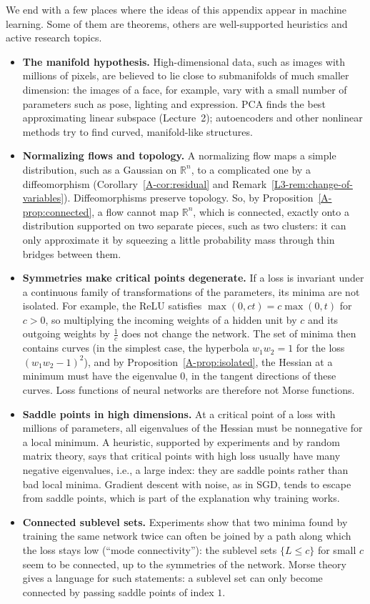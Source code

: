 We end with a few places where the ideas of this appendix appear in machine learning. Some of them are theorems, others are well-supported heuristics and active research topics.
\begin{itemize}
    \item \textbf{The manifold hypothesis.} High-dimensional data, such as images with millions of pixels, are believed to lie close to submanifolds of much smaller dimension: the images of a face, for example, vary with a small number of parameters such as pose, lighting and expression. PCA finds the best approximating linear subspace (Lecture~2); autoencoders and other nonlinear methods try to find curved, manifold-like structures.
    \item \textbf{Normalizing flows and topology.} A normalizing flow maps a simple distribution, such as a Gaussian on $\mathbb{R}^n$, to a complicated one by a diffeomorphism (Corollary~\ref{A-cor:residual} and Remark~\ref{L3-rem:change-of-variables}). Diffeomorphisms preserve topology. So, by Proposition~\ref{A-prop:connected}, a flow cannot map $\mathbb{R}^n$, which is connected, exactly onto a distribution supported on two separate pieces, such as two clusters: it can only approximate it by squeezing a little probability mass through thin bridges between them.
    \item \textbf{Symmetries make critical points degenerate.} If a loss is invariant under a continuous family of transformations of the parameters, its minima are not isolated. For example, the ReLU satisfies $\max(0, ct) = c\max(0, t)$ for $c > 0$, so multiplying the incoming weights of a hidden unit by $c$ and its outgoing weights by $\frac{1}{c}$ does not change the network. The set of minima then contains curves (in the simplest case, the hyperbola $w_1 w_2 = 1$ for the loss $(w_1 w_2 - 1)^2$), and by Proposition~\ref{A-prop:isolated}, the Hessian at a minimum must have the eigenvalue $0$, in the tangent directions of these curves. Loss functions of neural networks are therefore not Morse functions.
    \item \textbf{Saddle points in high dimensions.} At a critical point of a loss with millions of parameters, all eigenvalues of the Hessian must be nonnegative for a local minimum. A heuristic, supported by experiments and by random matrix theory, says that critical points with high loss usually have many negative eigenvalues, i.e., a large index: they are saddle points rather than bad local minima. Gradient descent with noise, as in SGD, tends to escape from saddle points, which is part of the explanation why training works.
    \item \textbf{Connected sublevel sets.} Experiments show that two minima found by training the same network twice can often be joined by a path along which the loss stays low (``mode connectivity''): the sublevel sets $\{L \leq c\}$ for small $c$ seem to be connected, up to the symmetries of the network. Morse theory gives a language for such statements: a sublevel set can only become connected by passing saddle points of index $1$.
\end{itemize}

